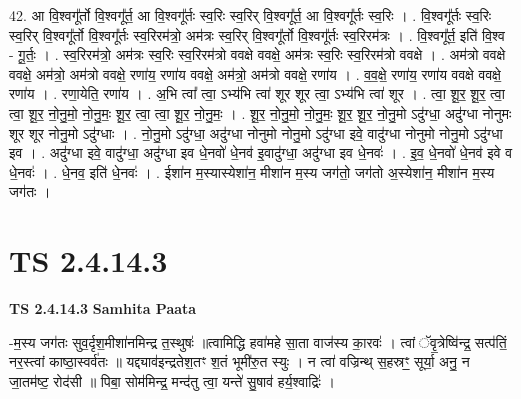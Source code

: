 \documentclass[17pt]{extarticle}
\begin{document}
42. आ वि॒श्वगू᳚र्तो वि॒श्वगू᳚र्त॒ आ वि॒श्वगू᳚र्तः स्व॒रिः स्व॒रिर् वि॒श्वगू᳚र्त॒ आ वि॒श्वगू᳚र्तः स्व॒रिः । . वि॒श्वगू᳚र्तः स्व॒रिः स्व॒रिर् वि॒श्वगू᳚र्तो वि॒श्वगू᳚र्तः स्व॒रिरम॑त्रो॒ अम॑त्रः स्व॒रिर् वि॒श्वगू᳚र्तो वि॒श्वगू᳚र्तः स्व॒रिरम॑त्रः । . वि॒श्वगू᳚र्त॒ इति॑ वि॒श्व - गू॒र्तः॒ । . स्व॒रिरम॑त्रो॒ अम॑त्रः स्व॒रिः स्व॒रिरम॑त्रो ववक्षे ववक्षे॒ अम॑त्रः स्व॒रिः स्व॒रिरम॑त्रो ववक्षे । . अम॑त्रो ववक्षे ववक्षे॒ अम॑त्रो॒ अम॑त्रो ववक्षे॒ रणा॑य॒ रणा॑य ववक्षे॒ अम॑त्रो॒ अम॑त्रो ववक्षे॒ रणा॑य । . व॒व॒क्षे॒ रणा॑य॒ रणा॑य ववक्षे ववक्षे॒ रणा॑य । . रणा॒येति॒ रणा॑य । . अ॒भि त्वा᳚ त्वा॒ ऽभ्य॑भि त्वा॑ शूर शूर त्वा॒ ऽभ्य॑भि त्वा॑ शूर । . त्वा॒ शू॒र॒ शू॒र॒ त्वा॒ त्वा॒ शू॒र॒ नो॒नु॒मो॒ नो॒नु॒मः॒ शू॒र॒ त्वा॒ त्वा॒ शू॒र॒ नो॒नु॒मः॒ । . शू॒र॒ नो॒नु॒मो॒ नो॒नु॒मः॒ शू॒र॒ शू॒र॒ नो॒नु॒मो ऽदु॑ग्धा॒ अदु॑ग्धा नोनुमः शूर शूर नोनु॒मो ऽदु॑ग्धाः । . नो॒नु॒मो ऽदु॑ग्धा॒ अदु॑ग्धा नोनुमो नोनु॒मो ऽदु॑ग्धा इवे॒ वादु॑ग्धा नोनुमो नोनु॒मो ऽदु॑ग्धा इव । . अदु॑ग्धा इवे॒ वादु॑ग्धा॒ अदु॑ग्धा इव धे॒नवो॑ धे॒नव॑ इ॒वादु॑ग्धा॒ अदु॑ग्धा इव धे॒नवः॑ । . इ॒व॒ धे॒नवो॑ धे॒नव॑ इवे व धे॒नवः॑ । . धे॒नव॒ इति॑ धे॒नवः॑ । . ईशा॑न म॒स्यास्येशा॑न॒ मीशा॑न म॒स्य जग॑तो॒ जग॑तो अ॒स्येशा॑न॒ मीशा॑न म॒स्य जग॑तः । \newline
\pagebreak
{}

\section{ TS 2.4.14.3 }

\textbf{TS 2.4.14.3 } \newline
\textbf{Samhita Paata} \newline

-म॒स्य जग॑तः सुव॒र्दृश॒मीशा॑नमिन्द्र त॒स्थुषः॑ ॥त्वामिद्धि हवा॑महे सा॒ता वाज॑स्य का॒रवः॑ । त्वां ॅवृ॒त्रेष्वि॑न्द्र॒ सत्प॑तिं॒ नर॒स्त्वां काष्ठा॒स्वर्व॑तः ॥ यद्द्याव॑इन्द्रतेश॒तꣳ श॒तं भूमी॑रु॒त स्युः । न त्वा॑ वज्रिन्थ् स॒हस्रꣳ॒॒ सूर्या॒ अनु॒ न जा॒तम॑ष्ट॒ रोद॑सी ॥ पिबा॒ सोम॑मिन्द्र॒ मन्द॑तु त्वा॒ यन्ते॑ सु॒षाव॑ हर्य॒श्वाद्रिः॑ । \newline
\end{document}
